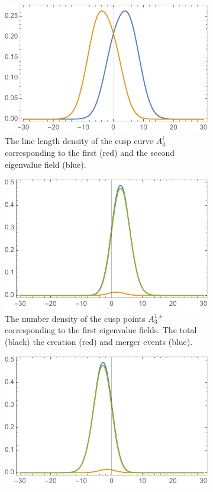 \documentclass[a4paper, 11pt]{article}
\begin{document}
\begin{figure}
\centering
\begin{subfigure}[b]{0.32\textwidth}
\includegraphics[width=\textwidth]{A3LengthDensity}
\caption{The line length density of the cusp curve $A_3^i$ corresponding to the first (red) and the second eigenvalue field (blue).\\}
\end{subfigure}
\begin{subfigure}[b]{0.32\textwidth}
\includegraphics[width=\textwidth]{A3NumberDensity_1}
\caption{The number density of the cusp points $A_3^{1\pm}$ corresponding to the first eigenvalue fields. The total (black) the creation (red) and merger events (blue).}
\end{subfigure}
\begin{subfigure}[b]{0.32\textwidth}
\includegraphics[width=\textwidth]{A3NumberDensity_2}

\end{subfigure}
\end{figure}
\end{document}
